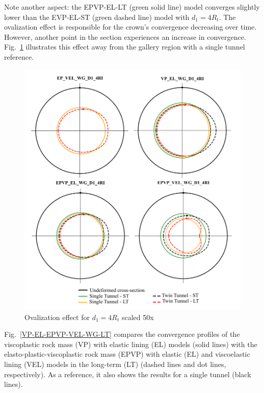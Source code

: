 \documentclass[a4paper,fleqn]{cas-sc}
\begin{document}
Note another aspect: the EPVP-EL-LT (green solid line) model converges slightly lower than the EVP-EL-ST (green dashed line) model with $d_1 = 4R_t$. The ovalization effect is responsible for the crown's convergence decreasing over time. However, another point in the section experiences an increase in convergence. Fig.~\ref{ovalization} illustrates this effect away from the gallery region with a single tunnel reference.
\begin{figure}[h!]
	\centering
	\includegraphics[scale=0.5]{ovalization.pdf}
	\caption{Ovalization effect for $d_1 = 4R_t$ scaled 50x}
	\label{ovalization}
\end{figure}
\FloatBarrier
Fig.~\ref{VP-EL-EPVP-VEL-WG-LT} compares the convergence profiles of the viscoplastic rock mass (VP) with elastic lining (EL) models (solid lines) with the elasto-plastic-viscoplastic rock mass (EPVP) with elastic (EL) and viscoelastic lining (VEL) models in the long-term (LT) (dashed lines and dot lines, respectively). As a reference, it also shows the results for a single tunnel (black lines).
\end{document}
